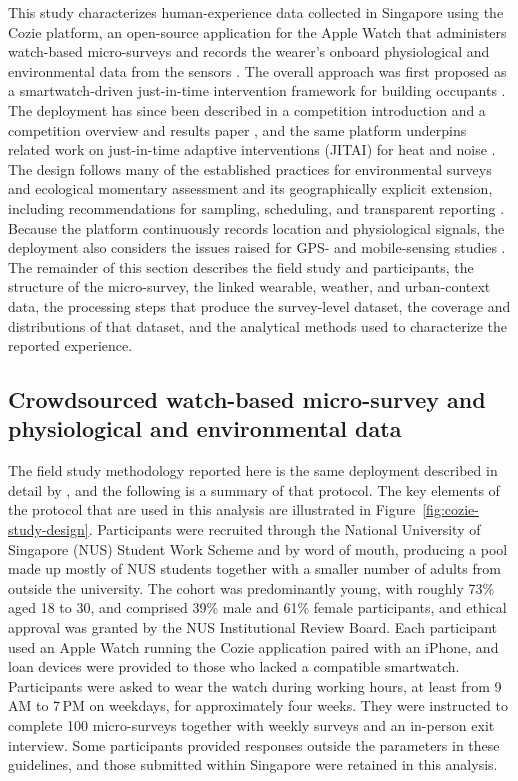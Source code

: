 \documentclass[]{interact}
\begin{document}
This study characterizes human-experience data collected in Singapore using the Cozie platform, an open-source application for the Apple Watch that administers watch-based micro-surveys and records the wearer's onboard physiological and environmental data from the sensors \citep{Tartarini2023-iu}.
The overall approach was first proposed as a smartwatch-driven just-in-time intervention framework for building occupants \citep{Miller2022-dy}.
The deployment has since been described in a competition introduction and a competition overview and results paper \citep{Miller2023-wi,Miller2025-qu}, and the same platform underpins related work on just-in-time adaptive interventions (JITAI) for heat and noise \citep{Miller2025-sv}.
The design follows many of the established practices for environmental surveys and ecological momentary assessment and its geographically explicit extension, including recommendations for sampling, scheduling, and transparent reporting \citep{Reichert2020-fs,Kingsbury2024-qe,Liao2016-ya,Graham2021-en}.
Because the platform continuously records location and physiological signals, the deployment also considers the issues raised for GPS- and mobile-sensing studies \citep{Kerr2011-ve,Fuller2017-xg}.
The remainder of this section describes the field study and participants, the structure of the micro-survey, the linked wearable, weather, and urban-context data, the processing steps that produce the survey-level dataset, the coverage and distributions of that dataset, and the analytical methods used to characterize the reported experience.

\subsection{Crowdsourced watch-based micro-survey and physiological and environmental data}\label{sec:methods-context}
The field study methodology reported here is the same deployment described in detail by \citet{Miller2025-sv}, and the following is a summary of that protocol. 
The key elements of the protocol that are used in this analysis are illustrated in Figure~\ref{fig:cozie-study-design}.
Participants were recruited through the National University of Singapore (NUS) Student Work Scheme and by word of mouth, producing a pool made up mostly of NUS students together with a smaller number of adults from outside the university.
The cohort was predominantly young, with roughly 73\% aged 18 to 30, and comprised 39\% male and 61\% female participants, and ethical approval was granted by the NUS Institutional Review Board.
Each participant used an Apple Watch running the Cozie application paired with an iPhone, and loan devices were provided to those who lacked a compatible smartwatch.
Participants were asked to wear the watch during working hours, at least from 9\,AM to 7\,PM on weekdays, for approximately four weeks.
They were instructed to complete 100 micro-surveys together with weekly surveys and an in-person exit interview. 
Some participants provided responses outside the parameters in these guidelines, and those submitted within Singapore were retained in this analysis.
\end{document}
